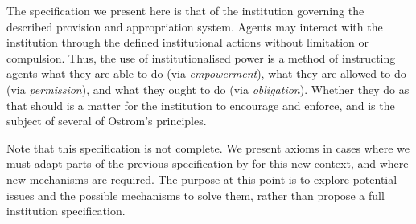 The specification we present here is that of the institution governing the
described provision and appropriation system. Agents may interact with the
institution through the defined institutional actions without limitation or
compulsion. Thus, the use of institutionalised power is a method of
instructing agents what they are able to do (via \emph{empowerment}), what
they are allowed to do (via \emph{permission}), and what they ought to do (via
\emph{obligation}). Whether they do as that should is a matter for the
institution to encourage and enforce, and is the subject of several of
Ostrom's principles.

Note that this specification is not complete. We present axioms in cases where
we must adapt parts of the previous specification by 
for this new context, and where new mechanisms are required. The purpose at
this point is to explore potential issues and the possible mechanisms to solve
them, rather than propose a full institution specification.

